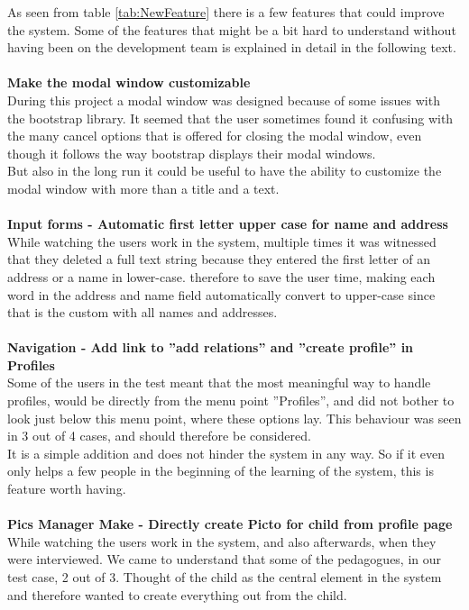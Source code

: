 As seen from table \ref{tab:NewFeature} there is a few features that could improve the system. Some of the features that might be a bit hard to understand without having been on the development team is explained in detail in the following text.\\
\\
\textbf{Make the modal window customizable}\\
During this project a modal window was designed because of some issues with the bootstrap library. It seemed that the user sometimes found it confusing with the many cancel options that is offered for closing the modal window, even though it follows the way bootstrap displays their modal windows.\\
But also in the long run it could be useful to have the ability to customize the modal window with more than a title and a text.\\
\\
\textbf{Input forms - Automatic first letter upper case for name and address}\\
While watching the users work in the system, multiple times it was witnessed that they deleted a full text string because they entered the first letter of an address or a name in lower-case. therefore to save the user time, making each word in the address and name field automatically convert to upper-case since that is the custom with all names and addresses.\\
\\
\textbf{Navigation - Add link to ''add relations'' and ''create profile'' in Profiles}\\
Some of the users in the test meant that the most meaningful way to handle profiles, would be directly from the menu point ''Profiles'', and did not bother to look just below this menu point, where these options lay. This behaviour was seen in 3 out of 4 cases, and should therefore be considered.\\
It is a simple addition and does not hinder the system in any way. So if it even only helps a few people in the beginning of the learning of the system, this is feature worth having.\\
\\
\textbf{Pics Manager Make - Directly create Picto for child from profile page}\\
While watching the users work in the system, and also afterwards, when they were interviewed. We came to understand that some of the pedagogues, in our test case, 2 out of 3. Thought of the child as the central element in the system and therefore wanted to create everything out from the child.\\
